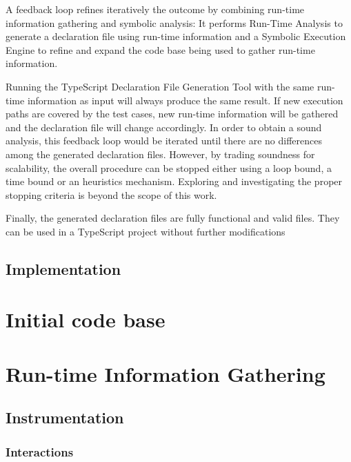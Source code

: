 A feedback loop refines iteratively the outcome by combining run-time information gathering and symbolic analysis: It performs Run-Time Analysis to generate a declaration file using run-time information and a Symbolic Execution Engine to refine and expand the code base being used to gather run-time information.

Running the TypeScript Declaration File Generation Tool with the same run-time information as input will always produce the same result. If new execution paths are covered by the test cases, new run-time information will be gathered and the declaration file will change accordingly. In order to obtain a sound analysis, this feedback loop would be iterated until there are no differences among the generated declaration files. However, by trading soundness for scalability, the overall procedure can be stopped either using a loop bound, a time bound or an heuristics mechanism. Exploring and investigating the proper stopping criteria is beyond the scope of this work.  

Finally, the generated declaration files are fully functional and valid files. They can be used in a TypeScript project without further modifications

\subsection{Implementation}

\section{Initial code base}

\section{Run-time Information Gathering} \label{run-time-information-gathering}
\subsection{Instrumentation}
\subsubsection{Interactions}

